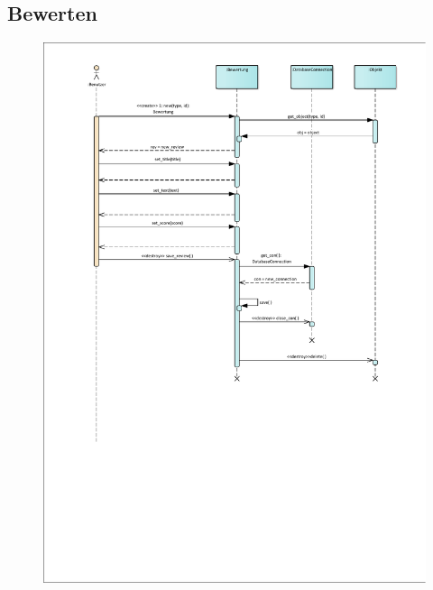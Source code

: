 \subsection*{Bewerten}
\begin{figure}[h!]
	\centering
	\includegraphics[width=0.8\linewidth]{docs/6_Sequenzdiagramme/Richard/sequenzdiagramm_bewerten.pdf}
	\label{fig:SeqDia_Bewerten}
\end{figure}
